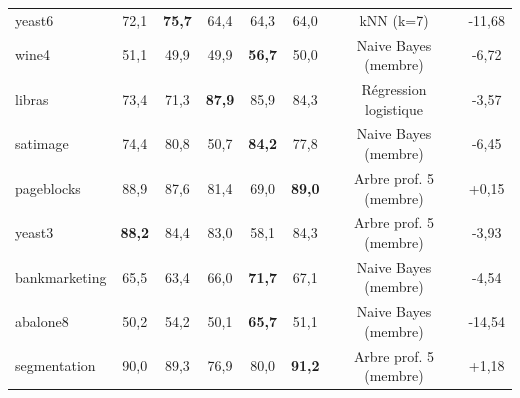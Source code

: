\begin{table}[tbp]
{\begin{tabular}{lccccccc}
yeast6 & 72,1 & \textbf{75,7} & 64,4 & 64,3 & 64,0 & kNN (k=7) & -11,68 \\
wine4 & 51,1 & 49,9 & 49,9 & \textbf{56,7} & 50,0 & Naive Bayes (membre) & -6,72 \\
libras & 73,4 & 71,3 & \textbf{87,9} & 85,9 & 84,3 & Régression logistique & -3,57 \\
satimage & 74,4 & 80,8 & 50,7 & \textbf{84,2} & 77,8 & Naive Bayes (membre) & -6,45 \\
pageblocks & 88,9 & 87,6 & 81,4 & 69,0 & \textbf{89,0} & Arbre prof. 5 (membre) & +0,15 \\
yeast3 & \textbf{88,2} & 84,4 & 83,0 & 58,1 & 84,3 & Arbre prof. 5 (membre) & -3,93 \\
bankmarketing & 65,5 & 63,4 & 66,0 & \textbf{71,7} & 67,1 & Naive Bayes (membre) & -4,54 \\
abalone8 & 50,2 & 54,2 & 50,1 & \textbf{65,7} & 51,1 & Naive Bayes (membre) & -14,54 \\
segmentation & 90,0 & 89,3 & 76,9 & 80,0 & \textbf{91,2} & Arbre prof. 5 (membre) & +1,18 \\
\bottomrule
\end{tabular}
}
\end{table}
